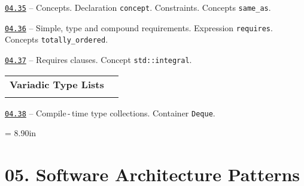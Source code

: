 \documentclass[a4paper,12pt]{article}
\renewenvironment{itemize}
{
    \begin{list}{\labelitemi}
    {
      \setlength{\topsep}{0pt}
      \setlength{\partopsep}{0pt}
      \setlength{\parskip}{0pt}
      \setlength{\itemsep}{0pt}
      \setlength{\parsep}{0pt}
      \setlength{\leftmargin}{14.5pt}
    }
}{\end{list}}
\begin{document}
\begin{itemize}

    \item \href{https://github.com/i-s-m-mipt/Education/blob/master/projects/examples/source/04.35.cpp}{\texttt{04.35}} -- Concepts. Declaration \lstinline{concept}. Constraints. Concepts \lstinline{same_as}.

    \smallskip

    \item \href{https://github.com/i-s-m-mipt/Education/blob/master/projects/examples/source/04.36.cpp}{\texttt{04.36}} -- Simple, type and compound requirements. Expression \lstinline{requires}. Concepts \lstinline{totally_ordered}.

    \smallskip

    \item \href{https://github.com/i-s-m-mipt/Education/blob/master/projects/examples/source/04.37.cpp}{\texttt{04.37}} -- Requires clauses. Concept \lstinline{std::integral}. 

\end{itemize}

\bigskip\medskip

\begin{tabular}{!{\vrule width 1pt}L{3.8cm}!{\vrule width 1pt}L{15.2cm}!{\vrule width 0pt}} 


\textbf{Variadic Type Lists} & \\


\end{tabular}

\medskip\smallskip

\begin{itemize}

    \item \href{https://github.com/i-s-m-mipt/Education/blob/master/projects/examples/source/04.38.cpp}{\texttt{04.38}} -- Compile\,-\,time type collections. Container \lstinline{Deque}. 

\end{itemize}



\newpage\thispagestyle{empty}\pdfpageheight = 8.90in\enlargethispage{100in}

\section{05. Software Architecture Patterns}
\end{document}
